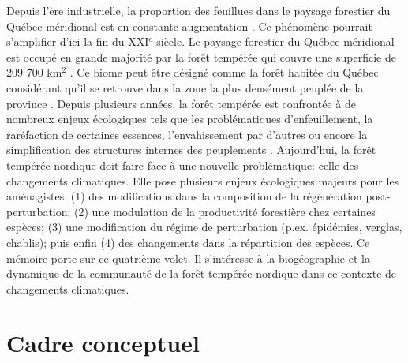 
Depuis l'ère industrielle, la proportion des feuillues dans le paysage forestier du Québec
méridional est en constante augmentation \citep{Dupuis2011,Boucher2006}. Ce phénomène pourrait
s'amplifier d'ici la fin du XXI$^e$ siècle.  Le paysage forestier du Québec méridional est occupé en
grande majorité par la forêt tempérée qui couvre une superficie de 209 700 km$^2$
\citep{Boulay2015}. Ce biome peut être désigné comme la forêt habitée du Québec considérant qu'il se
retrouve dans la zone la plus densément peuplée de la province \citep{Doyon2009}. Depuis plusieurs
années, la forêt tempérée est confrontée à de nombreux enjeux écologiques tels que les
problématiques d'enfeuillement, la raréfaction de certaines essences, l'envahissement par d’autres
ou encore la simplification des structures internes des peuplements \citep{Varady-Szabo2008}.
Aujourd'hui, la forêt tempérée nordique doit faire face à une nouvelle problématique: celle des
changements climatiques. Elle pose plusieurs enjeux écologiques majeurs pour les aménagistes: (1)
des modifications dans la composition de la régénération post-perturbation; (2) une modulation de la
productivité forestière chez certaines espèces; (3) une modification du régime de perturbation
(p.ex. épidémies, verglas, chablis); puis enfin (4) des changements dans la répartition des espèces.
Ce mémoire porte sur ce quatrième volet. Il s'intéresse à la biogéographie et la dynamique de la
communauté de la forêt tempérée nordique dans ce contexte de changements climatiques.

\section*{Cadre conceptuel}

